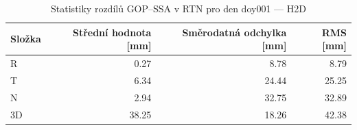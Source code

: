\begin{table}[H]
\centering
\caption{Statistiky rozdílů GOP–SSA v RTN pro den doy001 — H2D}
\label{tab:hd_ZAZG_doy001_day_stats}
\begin{tabular}{lrrr}
\toprule
Složka & Střední hodnota [mm] & Směrodatná odchylka [mm] & RMS [mm] \\
\midrule
R & 0.27 & 8.78 & 8.79 \\
T & 6.34 & 24.44 & 25.25 \\
N & 2.94 & 32.75 & 32.89 \\
3D & 38.25 & 18.26 & 42.38 \\
\bottomrule
\end{tabular}
\end{table}
